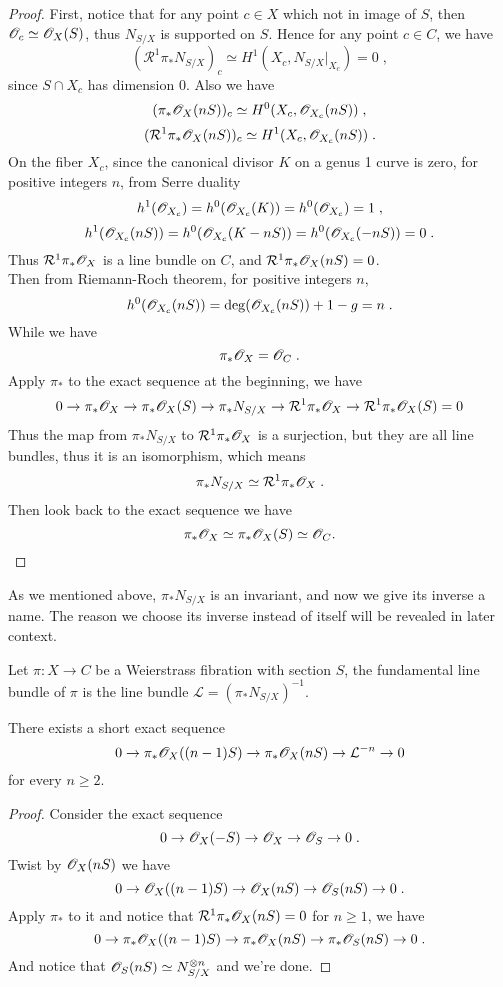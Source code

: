\begin{proof}
First, notice that for any point $c\in X$ which not in image of $S$, then $\mathscr{O}_c\simeq \mathscr{O}_X(S)$, thus $N_{S/X}$ is supported on $S$. Hence for any point $c\in C$, we have
\[(\mathcal{R}^1\pi_*N_{S/X})_c\simeq H^1(X_c, N_{S/X}|_{X_c})=0\; ,\]
since $S\cap X_c$ has dimension 0. Also we have
\[(\pi_*\mathscr{O}_X(nS))_c\simeq H^0(X_c, \mathscr{O}_{X_c}(nS))\; ,\]
\[(\mathcal{R}^1\pi_*\mathscr{O}_X(nS))_c\simeq H^1(X_c, \mathscr{O}_{X_c}(nS))\; .\]
On the fiber $X_c$, since the canonical divisor $K$ on a genus 1 curve is zero, for positive integers $n$, from Serre duality
\[h^1(\mathscr{O}_{X_c})=h^0(\mathscr{O}_{X_c}(K))=h^0(\mathscr{O}_{X_c})=1\; ,\] 
\[h^1(\mathscr{O}_{X_c}(nS))=h^0(\mathscr{O}_{X_c}(K-nS))=h^0(\mathscr{O}_{X_c}(-nS))=0\; .\]
Thus $\mathcal{R}^1\pi_*\mathscr{O}_X$ is a line bundle on $C$, and $\mathcal{R}^1\pi_*\mathscr{O}_X(nS)=0$.\\ \indent
Then from Riemann-Roch theorem, for positive integers $n$,
\[h^0(\mathscr{O}_{X_c}(nS))=\deg(\mathscr{O}_{X_c}(nS))+1-g=n\; .\]
\indent While we have
\[\pi_*\mathscr{O}_X=\mathscr{O}_C\; .\]
\indent Apply $\pi_*$ to the exact sequence at the beginning, we have
\[0\rightarrow \pi_*\mathscr{O}_X\rightarrow \pi_*\mathscr{O}_X(S)\rightarrow \pi_*N_{S/X}\rightarrow \mathcal{R}^1\pi_*\mathscr{O}_X\rightarrow \mathcal{R}^1\pi_*\mathscr{O}_X(S)=0\]
\indent Thus the map from $\pi_*N_{S/X}$ to $\mathcal{R}^1\pi_*\mathscr{O}_X$ is a surjection, but they are all line bundles, thus it is an isomorphism, which means
\[ \pi_*N_{S/X}\simeq \mathcal{R}^1\pi_*\mathscr{O}_X \; . \]
\indent Then look back to the exact sequence we have
\[ \pi_*\mathscr{O}_X\simeq\pi_*\mathscr{O}_X(S)\simeq \mathscr{O}_C. \qedhere\]
\end{proof}
As we mentioned above, $\pi_*N_{S/X}$ is an invariant, and now we give its inverse a name. The reason we choose its inverse instead of itself will be revealed in later context.
\begin{definition}
Let $\pi\colon X\rightarrow C$ be a Weierstrass fibration with section $S$, the fundamental line bundle of $\pi$ is the line bundle $\mathcal{L}=(\pi_*N_{S/X})^{-1}$.
\end{definition}
\begin{lemma}
There exists a short exact sequence
\[ 0\rightarrow \pi_*\mathscr{O}_X((n-1)S)\rightarrow \pi_*\mathscr{O}_X(nS)\rightarrow \mathcal{L}^{-n}\rightarrow 0 \]
for every $n\geq 2$.
\end{lemma}
\begin{proof}
Consider the exact sequence 
\[ 0\rightarrow \mathscr{O}_X(-S)\rightarrow \mathscr{O}_X\rightarrow \mathscr{O}_S\rightarrow 0\; . \]
\indent Twist by $\mathscr{O}_X(nS)$ we have
\[ 0\rightarrow \mathscr{O}_X((n-1)S)\rightarrow \mathscr{O}_X(nS)\rightarrow \mathscr{O}_S(nS)\rightarrow 0\; . \]
\indent Apply $\pi_*$ to it and notice that $\mathcal{R}^1\pi_*\mathscr{O}_X(nS)=0$ for $n\geq 1$, we have
\[ 0\rightarrow \pi_*\mathscr{O}_X((n-1)S)\rightarrow \pi_*\mathscr{O}_X(nS)\rightarrow \pi_*\mathscr{O}_S(nS)\rightarrow 0\; . \]
\indent And notice that $\mathscr{O}_S(nS)\simeq N_{S/X}^{\otimes n}$ and we're done.
\end{proof}
